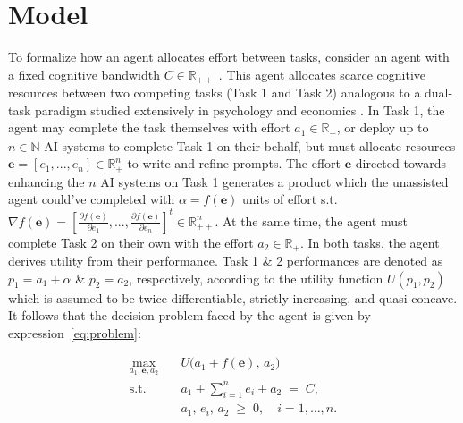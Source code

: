 \documentclass[11pt]{article}
\theoremstyle{definition}
\theoremstyle{remark}
\begin{document}
\section{Model}
\label{sec:Framework}
To formalize how an agent allocates effort between tasks, consider an agent with a fixed cognitive bandwidth $C\in\mathbb{R}_{++}$ \citep{simon1955behavioral,kahneman1973attention,norman1975data,navon1979economy,sims2003implications}. This agent allocates scarce cognitive resources between two competing tasks (Task 1 and Task 2) analogous to a dual-task paradigm studied extensively in psychology \citep{pashler1994dual} and economics \citep{holmstrom1991multitask,buser2012multitasking}. In Task 1, the agent may complete the task themselves with effort $a_1\in\mathbb{R}_+$, or deploy up to $n\in\mathbb{N}$ AI systems to complete Task 1 on their behalf, but must allocate resources $\mathbf{e}=[e_1,...,e_n]\in\mathbb{R}^n_{+}$ to write and refine prompts. The effort $\mathbf{e}$ directed towards enhancing the $n$ AI systems on Task 1 generates a product which the unassisted agent could've completed with $\alpha=f(\mathbf{e})$ units of effort s.t. $\nabla f(\mathbf{e})=[\frac{\partial f(\mathbf{e})}{\partial e_1},...,\frac{\partial f(\mathbf{e})}{\partial e_n}]^t\in\mathbb{R}^n_{++}$. At the same time, the agent must complete Task 2 on their own with the effort $a_2\in\mathbb{R}_{+}$. In both tasks, the agent derives utility from their performance. Task 1 \& 2 performances are denoted as $p_1=a_1+\alpha$ \& $p_2=a_2$, respectively, according to the utility function $U(p_1,p_2)$ \citep{drichoutis2020economic} which is assumed to be twice differentiable, strictly increasing, and quasi-concave. It follows that the decision problem faced by the agent is given by expression~\ref{eq:problem}:

\begin{equation}\label{eq:problem}
\begin{aligned}
\max_{a_1,\mathbf{e},a_2}\quad
& U\bigl(a_1 + f(\mathbf{e}),\, a_2\bigr)\\[6pt]
\text{s.t.}\quad
& a_1 + \sum_{i=1}^{n} e_i + a_2 \;=\; C,\\
& a_1,\,e_i,\,a_2 \;\ge\; 0,\quad i = 1,\dots,n.
\end{aligned}
\end{equation}
\end{document}
